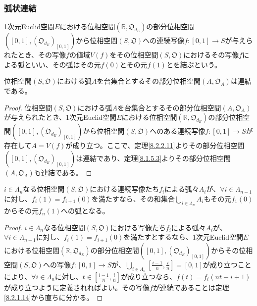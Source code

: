 \documentclass[dvipdfmx]{jsarticle}
\begin{document}
\subsubsection{弧状連結}%
\begin{dfn}
1次元Euclid空間$E$における位相空間$\left( \mathbb{R},\mathfrak{O}_{d_{E}} \right)$の部分位相空間$\left( [ 0,1],\left( \mathfrak{O}_{d_{E}} \right)_{[ 0,1]} \right)$から位相空間$\left( S,\mathfrak{O} \right)$への連続写像$f:[ 0,1] \rightarrow S$が与えられたとき、その写像$f$の値域$V(f)$をその位相空間$\left( S,\mathfrak{O} \right)$におけるその写像$f$による弧といい、その弧はその元$f(0)$とその元$f(1)$とを結ぶという。
\end{dfn}
\begin{thm}\label{8.2.2.17}
位相空間$\left( S,\mathfrak{O} \right)$における弧$A$を台集合とするその部分位相空間$\left( A,\mathfrak{O}_{A} \right)$は連結である。
\end{thm}
\begin{proof}
位相空間$\left( S,\mathfrak{O} \right)$における弧$A$を台集合とするその部分位相空間$\left( A,\mathfrak{O}_{A} \right)$が与えられたとき、1次元Euclid空間$E$における位相空間$\left( \mathbb{R},\mathfrak{O}_{d_{E}} \right)$の部分位相空間$\left( [ 0,1],\left( \mathfrak{O}_{d_{E}} \right)_{[ 0,1]} \right)$から位相空間$\left( S,\mathfrak{O} \right)$へのある連続写像$f:[ 0,1] \rightarrow S$が存在して$A = V(f)$が成り立つ。ここで、定理\ref{8.2.2.11}よりその部分位相空間$\left( [ 0,1],\left( \mathfrak{O}_{d_{E}} \right)_{[ 0,1]} \right)$は連結であり、定理\ref{8.1.5.3}よりその部分位相空間$\left( A,\mathfrak{O}_{A} \right)$も連結である。
\end{proof}
\begin{thm}\label{8.2.2.18}
$i \in \varLambda_{n}$なる位相空間$\left( S,\mathfrak{O} \right)$における連続写像たち$f_{i}$による弧々$A_{i}$が、$\forall i \in \varLambda_{n - 1}$に対し、$f_{i}(1) = f_{i + 1}(0)$を満たすなら、その和集合$\bigcup_{i \in \varLambda_{n}} A_{i}$もその元$f_{1}(0)$からその元$f_{n}(1)$への弧となる。
\end{thm}
\begin{proof}
$i \in \varLambda_{n}$なる位相空間$\left( S,\mathfrak{O} \right)$における写像たち$f_{i}$による弧々$A_{i}$が、$\forall i \in \varLambda_{n - 1}$に対し、$f_{i}(1) = f_{i + 1}(0)$を満たすとするなら、1次元Euclid空間$E$における位相空間$\left( \mathbb{R},\mathfrak{O}_{d_{E}} \right)$の部分位相空間$\left( [ 0,1],\left( \mathfrak{O}_{d_{E}} \right)_{[ 0,1]} \right)$からその位相空間$\left( S,\mathfrak{O} \right)$への写像$f:[ 0,1] \rightarrow S$が、$\bigcup_{i \in \varLambda_{n}} \left[ \frac{i - 1}{n},\frac{i}{n} \right] = [ 0,1]$が成り立つことにより、$\forall i \in \varLambda_{n}$に対し、$t \in \left[ \frac{i - 1}{n},\frac{i}{n} \right]$が成り立つなら、$f(t) = f_{i}(nt - i + 1)$が成り立つように定義されればよい。その写像$f$が連続であることは定理\ref{8.2.1.14}から直ちに分かる。
\end{proof}
\end{document}
